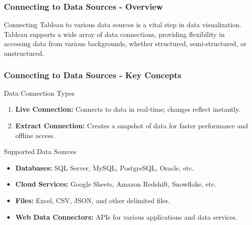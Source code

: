 \documentclass[aspectratio=169]{beamer}
\begin{document}
\begin{frame}[fragile]
    \frametitle{Connecting to Data Sources - Overview}
    Connecting Tableau to various data sources is a vital step in data visualization.\\
    Tableau supports a wide array of data connections, providing flexibility in accessing data from various backgrounds, whether structured, semi-structured, or unstructured.
\end{frame}

\begin{frame}[fragile]
    \frametitle{Connecting to Data Sources - Key Concepts}
    \begin{block}{Data Connection Types}
        \begin{enumerate}
            \item \textbf{Live Connection:} Connects to data in real-time; changes reflect instantly.
            \item \textbf{Extract Connection:} Creates a snapshot of data for faster performance and offline access.
        \end{enumerate}
    \end{block}
    
    \begin{block}{Supported Data Sources}
        \begin{itemize}
            \item \textbf{Databases:} SQL Server, MySQL, PostgreSQL, Oracle, etc.
            \item \textbf{Cloud Services:} Google Sheets, Amazon Redshift, Snowflake, etc.
            \item \textbf{Files:} Excel, CSV, JSON, and other delimited files.
            \item \textbf{Web Data Connectors:} APIs for various applications and data services.
        \end{itemize}
    \end{block}
\end{frame}
\end{document}
